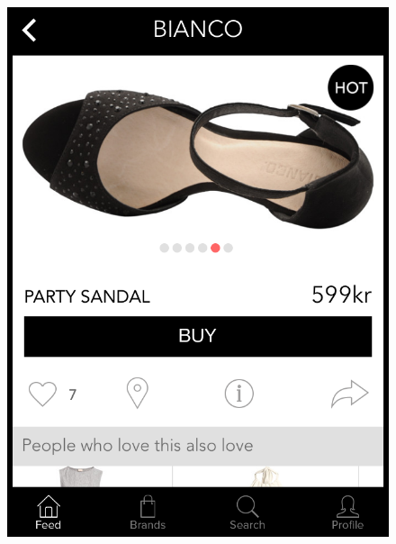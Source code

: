 	\begin{figure}[H]
			\centering
			\begin{minipage}{.30\linewidth}
						\includegraphics[height=1.5\linewidth]{image/SoBazaarproduct.png}
			\end{minipage}
			\hspace{.02\linewidth}
			\begin{minipage}{.3\linewidth}

\end{minipage}
\end{figure}
